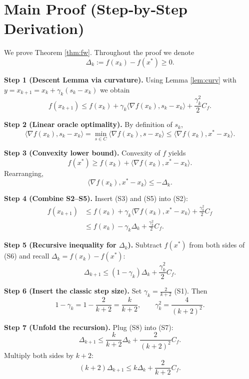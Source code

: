 \documentclass{article}
\begin{document}
\section*{Main Proof (Step‑by‑Step Derivation)}
We prove Theorem \ref{thm:fw}.  Throughout the proof we denote
\[
\Delta_k := f(x_k)-f(x^{*})\ge 0 .
\]

\noindent\textbf{Step 1 (Descent Lemma via curvature).}  
Using Lemma \ref{lem:curv} with $y = x_{k+1} = x_k+\gamma_k(s_k-x_k)$ we obtain
\[
f(x_{k+1}) \le f(x_k) + \gamma_k\langle\nabla f(x_k),s_k-x_k\rangle
+ \frac{\gamma_k^{2}}{2}C_f .
\tag{S2}
\]

\noindent\textbf{Step 2 (Linear oracle optimality).}  
By definition of $s_k$,
\[
\langle\nabla f(x_k),s_k-x_k\rangle
= \min_{s\in C}\langle\nabla f(x_k),s-x_k\rangle
\le \langle\nabla f(x_k),x^{*}-x_k\rangle .
\tag{S3}
\]

\noindent\textbf{Step 3 (Convexity lower bound).}  
Convexity of $f$ yields
\[
f(x^{*}) \ge f(x_k) + \langle\nabla f(x_k),x^{*}-x_k\rangle .
\tag{S4}
\]
Rearranging,
\[
\langle\nabla f(x_k),x^{*}-x_k\rangle \le -\Delta_k .
\tag{S5}
\]

\noindent\textbf{Step 4 (Combine S2–S5).}  
Insert (S3) and (S5) into (S2):
\[
\begin{aligned}
f(x_{k+1})
&\le f(x_k) + \gamma_k\bigl\langle\nabla f(x_k),x^{*}-x_k\bigr\rangle
+ \frac{\gamma_k^{2}}{2}C_f \\
&\le f(x_k) -\gamma_k\Delta_k + \frac{\gamma_k^{2}}{2}C_f .
\end{aligned}
\tag{S6}
\]

\noindent\textbf{Step 5 (Recursive inequality for $\Delta_k$).}  
Subtract $f(x^{*})$ from both sides of (S6) and recall $\Delta_k = f(x_k)-f(x^{*})$:
\[
\Delta_{k+1} \le (1-\gamma_k)\Delta_k + \frac{\gamma_k^{2}}{2}C_f .
\tag{S7}
\]

\noindent\textbf{Step 6 (Insert the classic step size).}  
Set $\gamma_k = \frac{2}{k+2}$ (S1).  Then
\[
1-\gamma_k = 1-\frac{2}{k+2}= \frac{k}{k+2},
\qquad
\gamma_k^{2} = \frac{4}{(k+2)^{2}} .
\tag{S8}
\]

\noindent\textbf{Step 7 (Unfold the recursion).}  
Plug (S8) into (S7):
\[
\Delta_{k+1}
\le \frac{k}{k+2}\Delta_k + \frac{2}{(k+2)^{2}}C_f .
\tag{S9}
\]
Multiply both sides by $k+2$:
\[
(k+2)\Delta_{k+1}
\le k\Delta_k + \frac{2}{k+2}C_f .
\tag{S10}
\]
\end{document}
